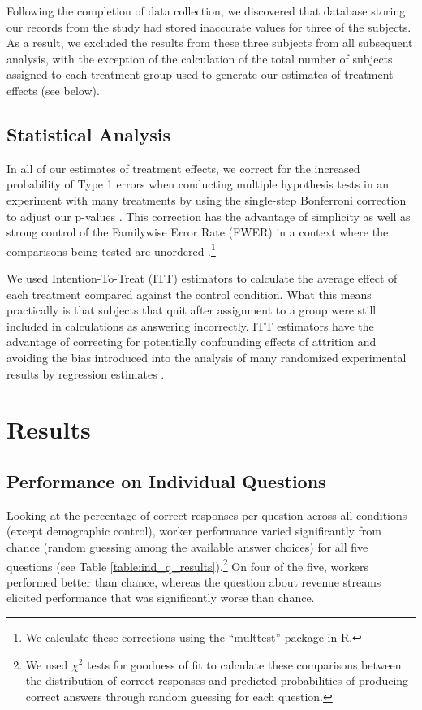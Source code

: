 \documentclass{chi2009}
\begin{document}
Following the completion of data collection, we discovered that
database storing our records from the study had stored inaccurate
values for three of the subjects. As a result, we excluded the results
from these three subjects from all subsequent analysis, with the
exception of the calculation of the total number of subjects assigned
to each treatment group used to generate our estimates of treatment
effects (see below).

\subsection{Statistical Analysis} 

In all of our estimates of treatment effects, we correct for the
increased probability of Type 1 errors when conducting multiple
hypothesis tests in an experiment with many treatments by using the
single-step Bonferroni correction to adjust our p-values
\cite{shaffer1995, hsu1996}. This correction has the advantage of
simplicity as well as strong control of the Familywise Error Rate
(FWER) in a context where the comparisons being tested are unordered
\cite{rosenthalrubin1984}.\footnote{We calculate these corrections
  using the
  \href{http://cran.r-project.org/web/packages/multtest/index.html}{``multtest''}
  package in \href{http://www.r-project.org}{R}.}

We used Intention-To-Treat (ITT) estimators to calculate the average
effect of each treatment compared against the control condition. What
this means practically is that subjects that quit after assignment to
a group were still included in calculations as answering
incorrectly. ITT estimators have the advantage of correcting for
potentially confounding effects of attrition and avoiding the bias
introduced into the analysis of many randomized experimental results
by regression estimates \cite{freedman2008logistic,
  freedman2008multtreat}.

%

\section{Results}

\subsection{Performance on Individual Questions}
Looking at the percentage of correct responses per question across all
conditions (except demographic control), worker performance varied
significantly from chance (random guessing among the available answer
choices) for all five questions (see Table
\ref{table:ind_q_results}).\footnote{We used $\chi^{2}$ tests for
  goodness of fit to calculate these comparisons between the
  distribution of correct responses and predicted probabilities of
  producing correct answers through random guessing for each
  question.} On four of the five, workers performed better than
chance, whereas the question about revenue streams elicited
performance that was significantly worse than chance.
\end{document}
